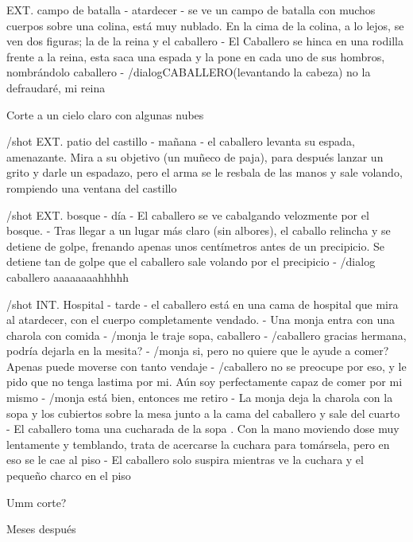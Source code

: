 EXT. campo de batalla - atardecer
- se ve un campo de batalla con muchos cuerpos sobre una colina, está muy nublado. En la cima de la colina, a lo lejos, se ven dos figuras; la de la reina y el caballero 
- El Caballero se hinca en una rodilla frente a la reina, esta saca una espada y la pone en cada uno de sus hombros, nombrándolo caballero
- /dialog{CABALLERO}{(levantando la cabeza) no la defraudaré, mi reina}

Corte a un cielo claro con algunas nubes

/shot
EXT. patio del castillo - mañana
- el caballero levanta su espada, amenazante. Mira a su objetivo (un muñeco de paja), para después lanzar un grito y darle un espadazo, pero el arma se le resbala de las manos y sale volando, rompiendo una ventana del castillo

/shot
EXT. bosque - día
- El caballero se ve cabalgando velozmente por el bosque. 
- Tras llegar a un lugar más claro (sin albores), el caballo relincha y se detiene de golpe, frenando apenas unos centímetros antes de un precipicio. Se detiene tan de golpe que el caballero sale volando por el precipicio 
- /dialog caballero aaaaaaaahhhhh

/shot
INT. Hospital - tarde 
- el caballero está en una cama de hospital que mira al atardecer, con el cuerpo completamente vendado.
- Una monja entra con una charola con comida 
- /monja le traje sopa, caballero 
- /caballero gracias hermana, podría dejarla en la mesita?
- /monja si, pero no quiere que le ayude a comer? Apenas puede moverse con tanto vendaje
- /caballero no se preocupe por eso, y le pido que no tenga lastima por mi. Aún soy perfectamente capaz de comer por mi mismo 
- /monja está bien, entonces me retiro
- La monja deja la charola con la sopa y los cubiertos sobre la mesa junto a la cama del caballero y sale del cuarto
- El caballero toma una cucharada de la sopa . Con la mano moviendo dose muy lentamente y temblando, trata de acercarse la cuchara para tomársela, pero en eso se le cae al piso
- El caballero solo suspira mientras ve la cuchara y el pequeño charco en el piso 

Umm corte?

Meses después